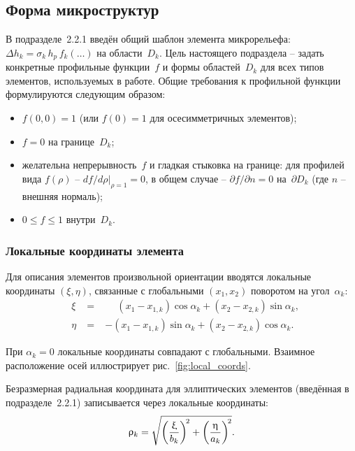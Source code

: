 \subsection{Форма микроструктур}

В подразделе~2.2.1 введён общий шаблон элемента микрорельефа:
$\Delta h_k = \sigma_k\, h_{p}\, f_k(\ldots)$ на области~$D_k$.
Цель настоящего подраздела -- задать конкретные профильные
функции~$f$ и формы областей~$D_k$ для всех типов элементов,
используемых в работе. Общие требования к профильной функции
формулируются следующим образом:
\begin{itemize}
  \item $f(0,0) = 1$ (или $f(0) = 1$ для осесимметричных элементов);
  \item $f = 0$ на границе~$D_k$;
  \item желательна непрерывность~$f$ и гладкая стыковка на границе:
        для профилей вида $f(\rho)$ -- $df/d\rho|_{\rho=1} = 0$,
        в общем случае -- $\partial f/\partial n = 0$ на~$\partial D_k$
        (где $n$ -- внешняя нормаль);
  \item $0 \leq f \leq 1$ внутри~$D_k$.
\end{itemize}


\subsubsection*{Локальные координаты элемента}

Для описания элементов произвольной ориентации вводятся локальные
координаты $(\xi, \eta)$, связанные с глобальными $(x_1, x_2)$
поворотом на угол~$\alpha_k$:
\begin{equation}
  \begin{alignedat}{2}
    & \xi  &\;=\;& \phantom{-}(x_1 - x_{1,k})\cos\alpha_k
            + (x_2 - x_{2,k})\sin\alpha_k, \\
    & \eta &\;=\;& -(x_1 - x_{1,k})\sin\alpha_k
            + (x_2 - x_{2,k})\cos\alpha_k.
  \end{alignedat}
  \label{eq:local_coords}
\end{equation}

При $\alpha_k = 0$ локальные координаты совпадают с глобальными. Взаимное расположение осей иллюстрирует рис.~\ref{fig:local_coords}.

Безразмерная радиальная координата для эллиптических элементов
(введённая в подразделе~2.2.1) записывается через локальные
координаты:
\begin{equation}
  \rho_k = \sqrt{\left(\frac{\xi}{b_k}\right)^{\!2}
              +\left(\frac{\eta\vphantom{\xi}}{a_k}\right)^{\!2}}.
  \label{eq:rho_local}
\end{equation}

